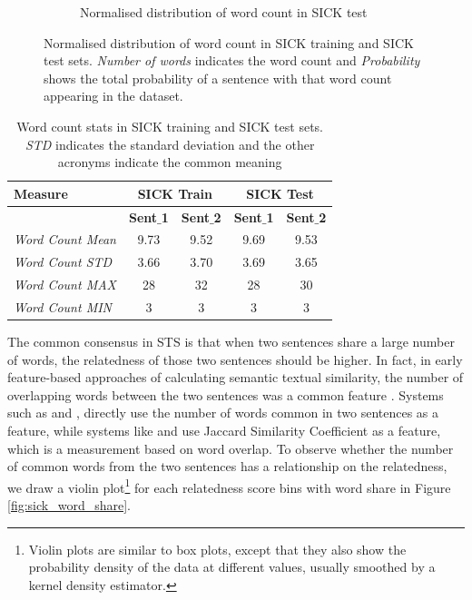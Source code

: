 \begin{enumerate}
\begin{figure}
\begin{subfigure}[b]{.5\textwidth}
		\caption{Normalised distribution of word count in SICK test}
		\label{fig:sick_test_words}
	\end{subfigure}
	\caption[Normalised distribution of word count in SICK training and SICK test sets.]{Normalised distribution of word count in SICK training and SICK test sets. \textit{Number of words} indicates the word count and \textit{Probability} shows the total probability of a sentence with that word count appearing in the dataset.}
	\label{fig:sick_words}
\end{figure}


\begin{table}
	\centering
	\begin{tabular}{l|cc|cc}
		\hline
		Measure   & \multicolumn{2}{c|}{SICK Train} & \multicolumn{2}{c}{SICK Test} \\
		\hline
		\multicolumn{1}{l|}{} & \textbf{Sent$\_$1} & \textbf{Sent$\_$2} & \textbf{Sent$\_$1} & \textbf{Sent$\_$2} \\
		\textit{Word Count Mean} & 9.73 & 9.52 & 9.69 & 9.53  \\
		\textit{Word Count STD} & 3.66 & 3.70 & 3.69 & 3.65  \\
		\textit{Word Count MAX} & 28 & 32 & 28 & 30  \\
		\textit{Word Count MIN} & 3 & 3 & 3 & 3  \\
		\hline
	\end{tabular}
	\caption[Word count stats in SICK]{Word count stats in SICK training and SICK test sets. \textit{STD} indicates the standard deviation and the other acronyms indicate the common meaning }
	\label{table:sick_sts}
\end{table}



The common consensus in STS is that when two sentences share a large number of words, the relatedness of those two sentences should be higher. In fact, in early feature-based approaches of calculating semantic textual similarity, the number of overlapping words between the two sentences was a common feature \autocite{vilarino-etal-2014-buap,  gupta-etal-2014-uow, lynum-etal-2014-ntnu, chavez-etal-2014-umcc}. Systems such as \textcite{vilarino-etal-2014-buap} and \textcite{lynum-etal-2014-ntnu}, directly use the number of words common in two sentences as a feature, while systems like \textcite{gupta-etal-2014-uow} and \textcite{chavez-etal-2014-umcc} use Jaccard Similarity Coefficient as a feature, which is a measurement based on word overlap. To observe whether the number of common words from the two sentences has a relationship on the relatedness, we draw a violin plot\footnote{Violin plots are similar to box plots, except that they also show the probability density of the data at different values, usually smoothed by a kernel density estimator.} for each relatedness score bins with word share in Figure \ref{fig:sick_word_share}.



\end{enumerate}
